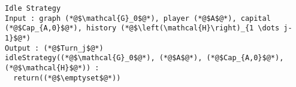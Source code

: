 {}
\begin{lstlisting}[label=idlestrategy]
Idle Strategy
Input : graph (*@$\mathcal{G}_0$@*), player (*@$A$@*), capital (*@$Cap_{A,0}$@*), history (*@$\left(\mathcal{H}\right)_{1 \dots j-1}$@*)
Output : (*@$Turn_j$@*)
idleStrategy((*@$\mathcal{G}_0$@*), (*@$A$@*), (*@$Cap_{A,0}$@*), (*@$\mathcal{H}$@*)) :
  return((*@$\emptyset$@*))
\end{lstlisting}
